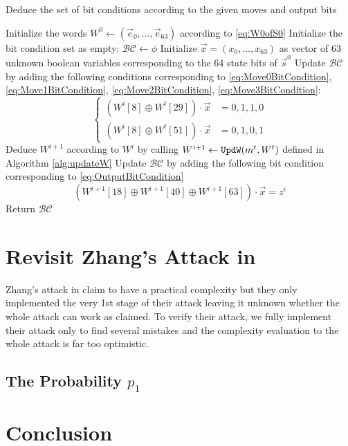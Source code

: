\begin{algorithm}[htbp]
	\caption{Deduce the set of bit conditions according to the given moves and output bits} \label{alg:getBC}
	\begin{algorithmic}[1]
\State Initialize the words $W^0\leftarrow (\vec e_0,\ldots, \vec e_{63})$ according to \eqref{eq:W0ofS0}
\State Initialize the bit condition set as empty: $\mathcal{BC}\leftarrow \phi$
\State Initialize $\vec{x}=(x_0,\ldots, x_{63})$ as vector of 63 unknown boolean variables corresponding to the 64 state bits of $\vec s^0$
\State Update $\mathcal{BC}$ by adding the following conditions corresponding to \eqref{eq:Move0BitCondition}, \eqref{eq:Move1BitCondition}, \eqref{eq:Move2BitCondition}, \eqref{eq:Move3BitCondition}:
\[
\left\{
\begin{split}
(W^i[8]\oplus W^t[29])\cdot \vec x&=0,1,1,0\\
(W^i[8]\oplus W^t[51])\cdot \vec x&=0,1,0,1
\end{split}
\right.
\]
\EndIf
\State Deduce $W^{i+1}$ according to $W^{i}$ by calling $W^{i+1}\leftarrow {\tt UpdW}(m^t,W^t)$ defined in Algorithm \ref{alg:updateW}
\State Update $\mathcal{BC}$ by adding the following bit condition corresponding to \eqref{eq:OutputBitCondition}
\[
(W^{i+1}[18]\oplus W^{i+1}[40]\oplus W^{i+1}[63])\cdot \vec x =z^i
\]
\EndFor
\State Return $\mathcal{BC}$
		\EndProcedure
	\end{algorithmic}
\end{algorithm}


\section{Revisit Zhang's Attack in \cite{AC:Zhang19}}
Zhang's attack in \cite{AC:Zhang19} claim to have a practical complexity but they only implemented the very 1st stage of their attack leaving it unknown whether the whole attack can work as claimed. 
To verify their attack, we fully implement their attack only to find several mistakes and the complexity evaluation to the whole attack is far too optimistic. 
\subsection{The Probability $p_1$}




\section{Conclusion}





\ifLNCSVER
  
\else
  
\fi





\ifLNCSVER

\else

\fi





